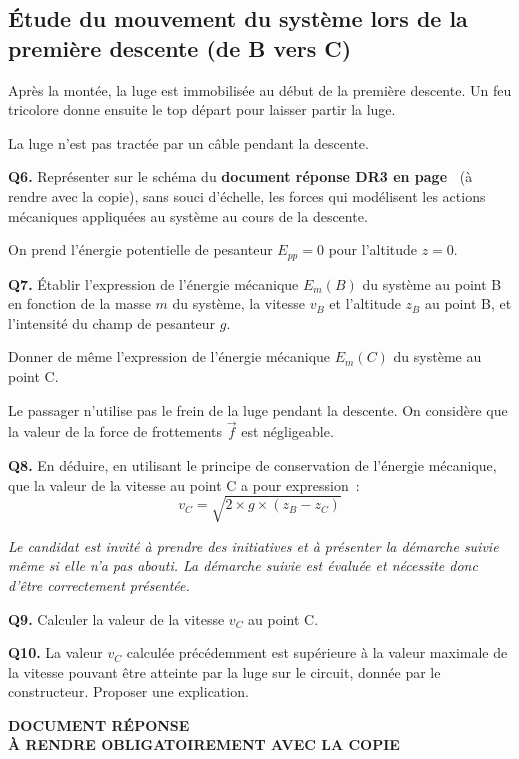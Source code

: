 \subsection{Étude du mouvement du système lors de la première descente (de B vers C)}

Après la montée, la luge est immobilisée au début de la première descente. Un feu tricolore donne ensuite le top départ pour laisser partir la luge.

La luge n’est pas tractée par un câble pendant la descente.

\medskip
\noindent
\textbf{Q6.} Représenter sur le schéma du \textbf{document réponse DR3 en page~} (à rendre avec la copie), sans souci d’échelle, les forces qui modélisent les actions mécaniques appliquées au système au cours de la descente.

On prend l’énergie potentielle de pesanteur $E_{pp} = 0$ pour l’altitude $z = 0$.

\medskip
\noindent
\textbf{Q7.} Établir l’expression de l’énergie mécanique $E_m(B)$ du système au point B en fonction de la masse $m$ du système, la vitesse $v_B$ et l’altitude $z_B$ au point B, et l’intensité du champ de pesanteur $g$.

Donner de même l’expression de l’énergie mécanique $E_m(C)$ du système au point C.

Le passager n’utilise pas le frein de la luge pendant la descente. On considère que la valeur de la force de frottements $\vec{f}$ est négligeable.

\medskip
\noindent
\textbf{Q8.} En déduire, en utilisant le principe de conservation de l’énergie mécanique, que la valeur de la vitesse au point C a pour expression~:
\[
v_C = \sqrt{2 \times g \times (z_B - z_C)}
\]

\textit{Le candidat est invité à prendre des initiatives et à présenter la démarche suivie même si elle n’a pas abouti. La démarche suivie est évaluée et nécessite donc d’être correctement présentée.}

\medskip
\noindent
\textbf{Q9.} Calculer la valeur de la vitesse $v_C$ au point C.

\medskip
\noindent
\textbf{Q10.} La valeur $v_C$ calculée précédemment est supérieure à la valeur maximale de la vitesse pouvant être atteinte par la luge sur le circuit, donnée par le constructeur.
Proposer une explication.

\AMCcleardoublepage
\begin{center}
\textbf{DOCUMENT RÉPONSE \\
À RENDRE OBLIGATOIREMENT AVEC LA COPIE}
\end{center}

